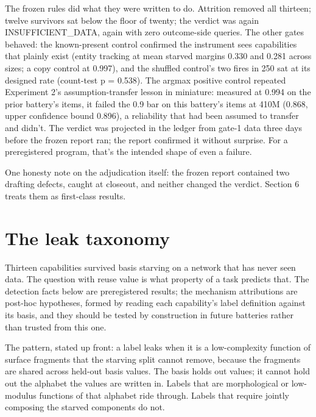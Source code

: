 The frozen rules did what they were written to do. Attrition removed all
thirteen; twelve survivors sat below the floor of twenty; the verdict was
again INSUFFICIENT\_DATA, again with zero outcome-side queries. The other
gates behaved: the known-present control confirmed the instrument sees
capabilities that plainly exist (entity tracking at mean starved margins
0.330 and 0.281 across sizes; a copy control at 0.997), and the shuffled
control's two fires in 250 sat at its designed rate (count-test
p = 0.538). The argmax positive control repeated Experiment 2's
assumption-transfer lesson in miniature: measured at 0.994 on the prior
battery's items, it failed the 0.9 bar on this battery's items at 410M
(0.868, upper confidence bound 0.896), a reliability that had been
assumed to transfer and didn't. The verdict was projected in the ledger from gate-1 data
three days before the frozen report ran; the report confirmed it without
surprise. For a preregistered program, that's the intended shape of even
a failure.

One honesty note on the adjudication itself: the frozen report
contained two drafting defects, caught at closeout, and neither changed
the verdict. Section 6 treats them as first-class results.

\section{The leak taxonomy}\label{the-leak-taxonomy}

Thirteen capabilities survived basis starving on a network that has never
seen data. The question with reuse value is what property of a task
predicts that. The detection facts below are preregistered results; the
mechanism attributions are post-hoc hypotheses, formed by reading each
capability's label definition against its basis, and they should be
tested by construction in future batteries rather than trusted from this
one.

The pattern, stated up front: a label leaks when it is a low-complexity
function of surface fragments that the starving split cannot remove,
because the fragments are shared across held-out basis values. The basis
holds out values; it cannot hold out the alphabet the values are written
in. Labels that are morphological or low-modulus functions of that
alphabet ride through. Labels that require jointly composing the starved
components do not.

